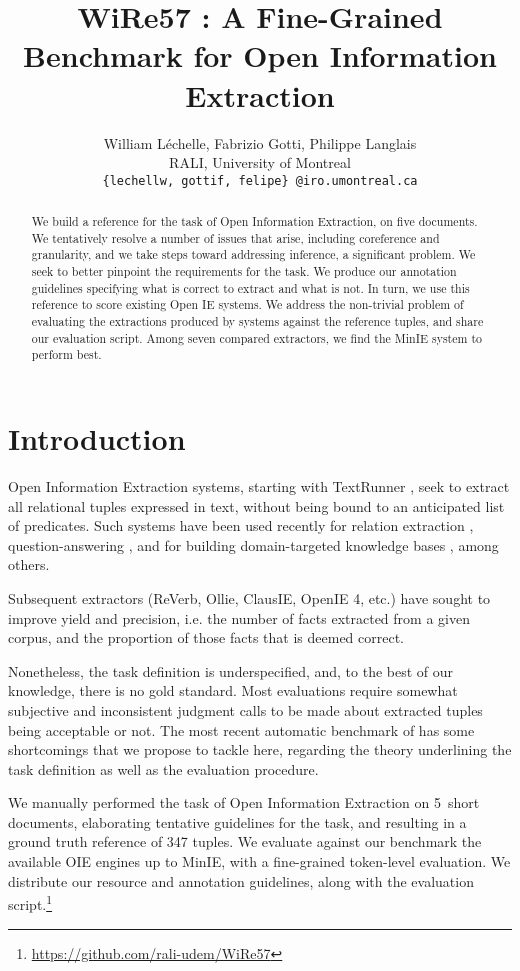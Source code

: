 \pdfoutput=1 \documentclass[11pt, a4paper]{article}
\author{William Léchelle, Fabrizio Gotti, Philippe Langlais \\
  RALI, University of Montreal \\
  \texttt{\{lechellw, gottif, felipe\} @iro.umontreal.ca}
}
\date{}
\title{WiRe57 : A Fine-Grained Benchmark for Open Information Extraction}
\begin{document}
\maketitle
\begin{abstract}
   We build a reference for the task of Open Information Extraction, on five
   documents. We tentatively resolve a number of issues that arise, including
   coreference and granularity, and we take steps toward addressing inference, a significant problem. We seek to better pinpoint the requirements for
   the task. We produce our annotation guidelines specifying what is correct to
   extract and what is not. In turn, we use this reference to score existing
   Open IE systems. We address the non-trivial problem of evaluating the
    extractions produced by systems against the reference
   tuples, and share our evaluation script. Among seven compared extractors, we
   find the MinIE system to perform best.
\end{abstract}

\section{Introduction}
\label{sec:orgb2105d7}
Open Information Extraction systems, starting with TextRunner
\cite{Yates:2007:TOI:1614164.1614177}, seek to extract all relational tuples
expressed in text, without being bound to an anticipated list of predicates.
Such systems have been used recently for relation extraction
\cite{DBLP:conf/tac/SoderlandGBEW13}, question-answering
\cite{Fader:2014:OQA:2623330.2623677}, and for building domain-targeted
knowledge bases \cite{DBLP:journals/tacl/MishraTC17}, among others.

Subsequent extractors (ReVerb, Ollie, ClausIE, OpenIE 4, etc.) have sought
to improve yield and precision, i.e. the number of facts extracted from a
given corpus, and the proportion of those facts that is deemed correct.

Nonetheless, the task definition is underspecified, and, to the best of our
knowledge, there is no gold standard. Most evaluations require somewhat
subjective and inconsistent judgment calls to be made about extracted tuples
being acceptable or not.  The most recent automatic benchmark of
\citet{Stanovsky2016EMNLP} has some shortcomings that we propose to tackle
here, regarding the theory underlining the task definition as well as the
evaluation procedure.

We manually performed the task of Open Information Extraction on
5~short documents, elaborating tentative guidelines for the task, and resulting
in a ground truth reference of 347 tuples. We evaluate against our benchmark
the available OIE engines up to MinIE, with a fine-grained token-level
evaluation. We distribute our resource and annotation guidelines, along with
the evaluation script.\footnote{\url{https://github.com/rali-udem/WiRe57}}
\end{document}
